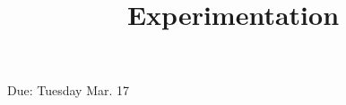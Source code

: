 \documentclass[a4, 12pt]{article}
\title{Experimentation}
\author{}
\date{}
\begin{document}
\maketitle

Due: Tuesday Mar. 17
\end{document}
